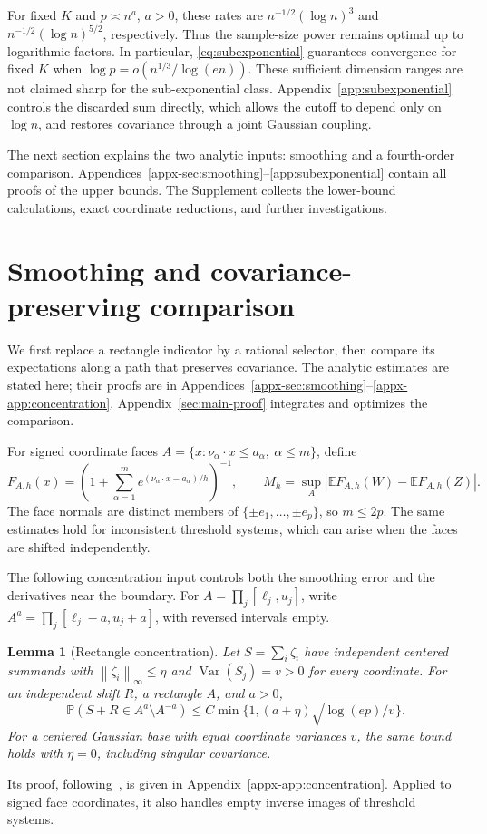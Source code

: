 \documentclass[11pt,letterpaper]{article}
\newtheorem{lemma}{Lemma}
\theoremstyle{remark}
\newcommand{\E}{\mathbb E}
\newcommand{\Pp}{\mathbb P}
\newcommand{\Var}{\operatorname{Var}}
\newcommand{\norm}[1]{\left\lVert#1\right\rVert}
\begin{document}
For fixed \(K\) and \(p\asymp n^a\), \(a>0\), these rates are
\(n^{-1/2}(\log n)^3\) and
\(n^{-1/2}(\log n)^{5/2}\), respectively. Thus the sample-size
power remains optimal up to logarithmic factors. In particular,
\eqref{eq:subexponential} guarantees convergence for fixed \(K\) when
\(\log p=o(n^{1/3}/\log(en))\). These sufficient dimension ranges
are not claimed sharp for the sub-exponential class.
Appendix~\ref{app:subexponential} controls the discarded sum directly,
which allows the cutoff to depend only on \(\log n\), and restores
covariance through a joint Gaussian coupling.

The next section explains the two analytic inputs: smoothing and a
fourth-order comparison. Appendices~\ref{appx-sec:smoothing}--\ref{app:subexponential}
contain all proofs of the upper bounds. The Supplement collects the
lower-bound calculations, exact coordinate reductions, and further
investigations.


\section{Smoothing and covariance-preserving comparison}
\label{sec:smoothing}\label{sec:support}

We first replace a rectangle indicator by a rational selector, then
compare its expectations along a path that preserves covariance.
The analytic estimates are stated here; their proofs are in
Appendices~\ref{appx-sec:smoothing}--\ref{appx-app:concentration}.
Appendix~\ref{sec:main-proof} integrates and optimizes the comparison.

For signed coordinate faces
\(A=\{x:\nu_\alpha\cdot x\le a_\alpha,\ \alpha\le m\}\), define
\begin{equation}
 F_{A,h}(x)=\left(1+\sum_{\alpha=1}^m
          e^{(\nu_\alpha\cdot x-a_\alpha)/h}\right)^{-1},
 \qquad M_h=\sup_A|\E F_{A,h}(W)-\E F_{A,h}(Z)|.
 \label{eq:selector}
\end{equation}
The face normals are distinct members of \(\{\pm e_1,\ldots,\pm e_p\}\),
so \(m\le2p\). The same estimates hold for inconsistent threshold
systems, which can arise when the faces are shifted independently.

The following concentration input controls both the smoothing error
and the derivatives near the boundary. For
\(A=\prod_j[\ell_j,u_j]\), write
\(A^a=\prod_j[\ell_j-a,u_j+a]\), with reversed intervals empty.
\begin{lemma}[Rectangle concentration]\label{lem:concentration}
Let \(S=\sum_i\zeta_i\) have independent centered summands with
\(\norm{\zeta_i}_\infty\le\eta\) and
\(\Var(S_j)=v>0\) for every coordinate. For an independent shift
\(R\), a rectangle \(A\), and \(a>0\),
\[
 \Pp(S+R\in A^a\setminus A^{-a})
 \le C\min\{1,(a+\eta)\sqrt{\log(ep)/v}\}.
\]
For a centered Gaussian base with equal coordinate variances \(v\),
the same bound holds with \(\eta=0\), including singular covariance.
\end{lemma}
Its proof, following~\cite[Lemma~2.1]{AL}, is given in
Appendix~\ref{appx-app:concentration}. Applied to signed face
coordinates, it also handles empty inverse images of threshold systems.
\end{document}
